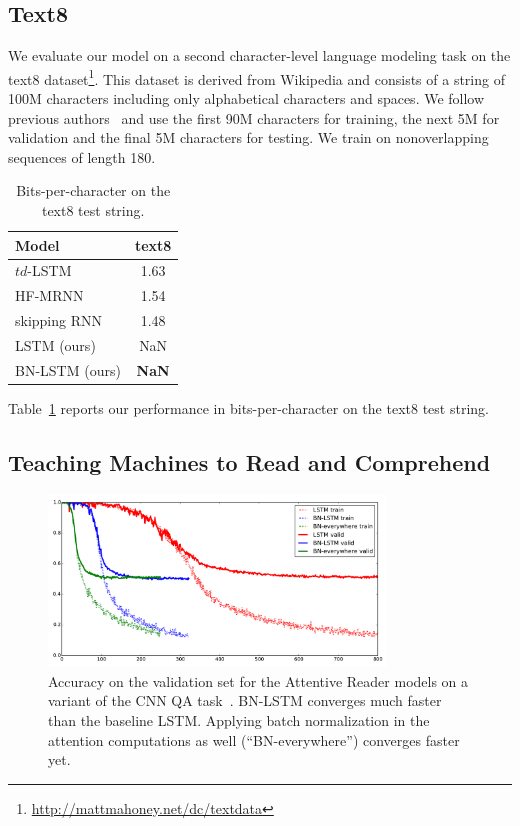 \documentclass{article} %
\begin{document}
\subsection{Text8}

We evaluate our model on a second character-level language modeling task on the text8 dataset\footnote{\url{http://mattmahoney.net/dc/textdata}}.
This dataset is derived from Wikipedia and consists of a string of 100M characters including only alphabetical characters and spaces.
We follow previous authors~\cite{mikolov2012subword,zhang2016architectural} and use the first 90M characters for training, the next 5M for validation and the final 5M characters for testing.
We train on nonoverlapping sequences of length 180.

\begin{table}
\center
\begin{tabular}{@{}lc@{}}
  \toprule
  \bf Model & \bf text8 \\
  \midrule
  $td$-LSTM~\cite{zhang2016architectural} & 1.63 \\
  HF-MRNN~\cite{mikolov2012subword} & 1.54 \\
  skipping RNN~\cite{pachitariu2013regularization} & 1.48 \\
  \midrule
  LSTM (ours) & NaN \\
  BN-LSTM (ours) & \textbf{NaN} \\
  \bottomrule
\end{tabular}
\caption{Bits-per-character on the text8 test string.}
\label{tab:text8_test}
\end{table}

Table~\ref{tab:text8_test} reports our performance in bits-per-character on the text8 test string.

\subsection{Teaching Machines to Read and Comprehend}

\begin{figure}
\center
\includegraphics[width=0.8\textwidth]{figures/attr_valid.pdf}
\caption{
Accuracy on the validation set for the Attentive Reader models on a variant of the CNN QA task~\cite{attentivereader}.
BN-LSTM converges much faster than the baseline LSTM.
Applying batch normalization in the attention computations as well (``BN-everywhere'') converges faster yet.
}
\label{fig:attr_valid}
\end{figure}
\end{document}
